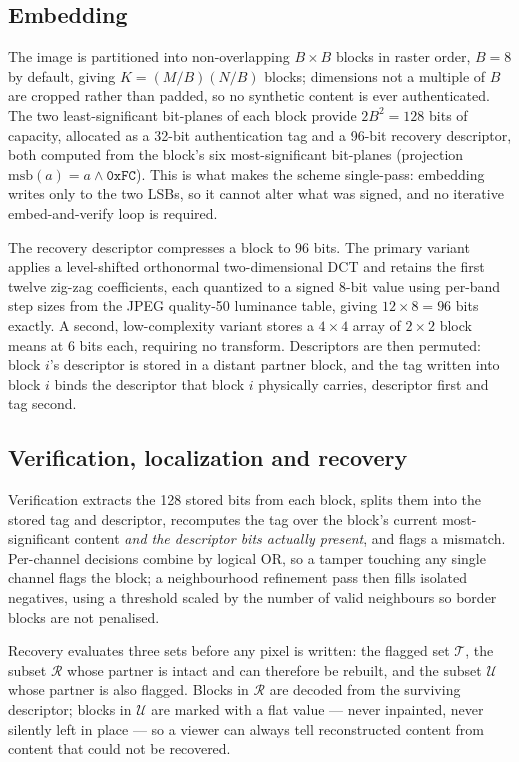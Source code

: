 \documentclass[12pt,a4paper]{article}
\begin{document}
\subsection{Embedding}

The image is partitioned into non-overlapping $B \times B$ blocks in raster
order, $B = 8$ by default, giving $K = (M/B)(N/B)$ blocks; dimensions not a
multiple of $B$ are cropped rather than padded, so no synthetic content is
ever authenticated. The two least-significant bit-planes of each block
provide $2B^2 = 128$ bits of capacity, allocated as a 32-bit authentication
tag and a 96-bit recovery descriptor, both computed from the block's six
most-significant bit-planes (projection $\mathrm{msb}(a) = a \wedge
\mathtt{0xFC}$). This is what makes the scheme single-pass: embedding writes
only to the two LSBs, so it cannot alter what was signed, and no iterative
embed-and-verify loop is required.

The recovery descriptor compresses a block to 96 bits. The primary variant
applies a level-shifted orthonormal two-dimensional DCT and retains the first
twelve zig-zag coefficients, each quantized to a signed 8-bit value using
per-band step sizes from the JPEG quality-50 luminance table, giving
$12 \times 8 = 96$ bits exactly. A second, low-complexity variant stores a
$4 \times 4$ array of $2 \times 2$ block means at 6 bits each, requiring no
transform. Descriptors are then permuted: block $i$'s descriptor is stored in
a distant partner block, and the tag written into block $i$ binds the
descriptor that block $i$ physically carries, descriptor first and tag
second.

\subsection{Verification, localization and recovery}

Verification extracts the 128 stored bits from each block, splits them into
the stored tag and descriptor, recomputes the tag over the block's current
most-significant content \emph{and the descriptor bits actually present}, and
flags a mismatch. Per-channel decisions combine by logical OR, so a tamper
touching any single channel flags the block; a neighbourhood refinement pass
then fills isolated negatives, using a threshold scaled by the number of
valid neighbours so border blocks are not penalised.

Recovery evaluates three sets before any pixel is written: the flagged set
$\mathcal{T}$, the subset $\mathcal{R}$ whose partner is intact and can
therefore be rebuilt, and the subset $\mathcal{U}$ whose partner is also
flagged. Blocks in $\mathcal{R}$ are decoded from the surviving descriptor;
blocks in $\mathcal{U}$ are marked with a flat value --- never inpainted,
never silently left in place --- so a viewer can always tell reconstructed
content from content that could not be recovered.
\end{document}
